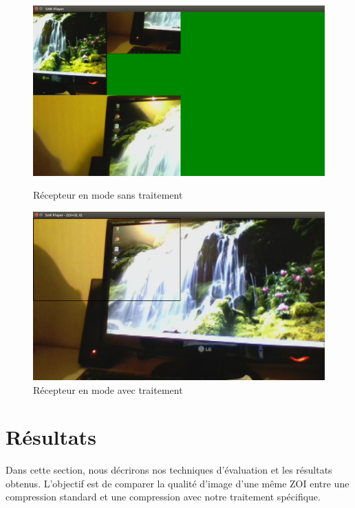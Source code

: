 \documentclass[11pt,a4paper]{article}
\begin{document}
\begin{figure}[!htb]
  \includegraphics[width=\linewidth]{images/recepteur_sans_traitement.png}
  \caption{Récepteur en mode sans traitement}
\endminipage\hfill
{}
  \includegraphics[width=\linewidth]{images/recepteur_avec_traitement.png}
  \caption{Récepteur en mode avec traitement}
\endminipage
\end{figure}

\section{Résultats}

Dans cette section, nous décrirons nos techniques d'évaluation et les résultats obtenus.
L'objectif est de comparer la qualité d'image d'une même ZOI entre une compression standard et une compression avec notre traitement spécifique.
\end{document}
